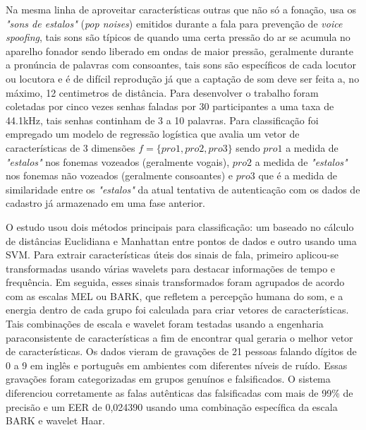 			\par Na mesma linha de aproveitar características outras que não só a fonação, \cite{9744556} usa os \textit{"sons de estalos"} (\textit{pop noises}) emitidos durante a fala para prevenção de \textit{voice spoofing}, tais sons são típicos de quando uma certa pressão do ar se acumula no aparelho fonador sendo liberado em ondas de maior pressão, geralmente durante a pronúncia de palavras com consoantes, tais sons são específicos de cada locutor ou locutora e é de difícil reprodução já que a captação de som deve ser feita a, no máximo, 12 centimetros de distância. Para desenvolver o trabalho foram coletadas por cinco vezes senhas faladas por 30 participantes a uma taxa de 44.1kHz, tais senhas continham de 3 a 10 palavras. Para classificação foi empregado um modelo de regressão logística que avalia um vetor de características de 3 dimensões $f=\{pro1, pro2, pro3\}$ sendo $pro1$ a medida de \textit{"estalos"} nos fonemas vozeados (geralmente vogais), $pro2$ a medida de \textit{"estalos"} nos fonemas não vozeados (geralmente consoantes) e $pro3$ que é a medida de similaridade entre os \textit{"estalos"} da atual tentativa de autenticação com os dados de cadastro já armazenado em uma fase anterior.
			
			\par O estudo \cite{furlan2021caracterizacao} usou dois métodos principais para classificação: um baseado no cálculo de distâncias Euclidiana e Manhattan entre pontos de dados e outro usando uma SVM. Para extrair características úteis dos sinais de fala, primeiro aplicou-se transformadas usando várias wavelets para destacar informações de tempo e frequência. Em seguida, esses sinais transformados foram agrupados de acordo com as escalas MEL ou BARK, que refletem a percepção humana do som, e a energia dentro de cada grupo foi calculada para criar vetores de características. Tais combinações de escala e wavelet foram testadas usando a engenharia paraconsistente de características a fim de encontrar qual geraria o melhor vetor de características. Os dados vieram de gravações de 21 pessoas falando dígitos de 0 a 9 em inglês e português em ambientes com diferentes níveis de ruído. Essas gravações foram categorizadas em grupos genuínos e falsificados. O sistema diferenciou corretamente as falas autênticas das falsificadas com mais de 99\% de precisão e um EER de 0,024390 usando uma combinação específica da escala BARK e wavelet Haar.

